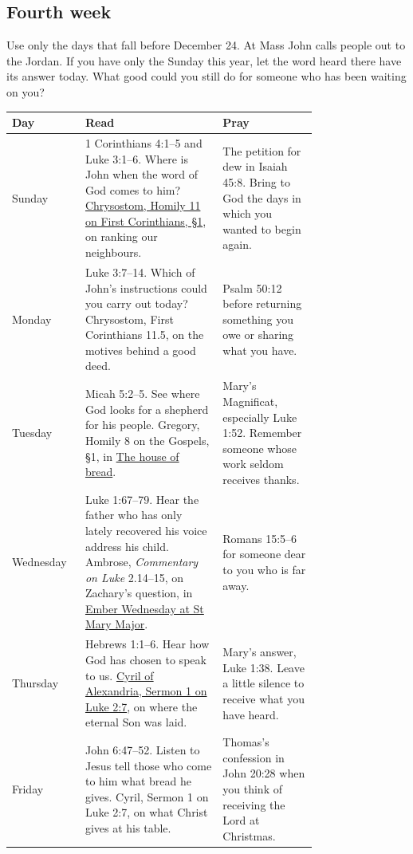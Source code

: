 \subsection{Fourth week}

Use only the days that fall before December 24. At Mass John calls
people out to the Jordan. If you have only the Sunday this year, let
the word heard there have its answer today. What good could you still
do for someone who has been waiting on you?

\begin{longtable}{@{}lp{0.45\linewidth}p{0.31\linewidth}@{}}
\textbf{Day} & \textbf{Read} & \textbf{Pray} \\
\hline
\endhead
Sunday & 1 Corinthians 4:1--5 and Luke 3:1--6. Where is John when the word of God comes to him? \href{https://www.newadvent.org/fathers/220111.htm}{Chrysostom, Homily 11 on First Corinthians, §1}, on ranking our neighbours. & The petition for dew in Isaiah 45:8. Bring to God the days in which you wanted to begin again. \\
Monday & Luke 3:7--14. Which of John's instructions could you carry out today? Chrysostom, First Corinthians 11.5, on the motives behind a good deed. & Psalm 50:12 before returning something you owe or sharing what you have. \\
Tuesday & Micah 5:2--5. See where God looks for a shepherd for his people. Gregory, Homily 8 on the Gospels, §1, in \hyperref[sec:advent-bethlehem]{The house of bread}. & Mary's Magnificat, especially Luke 1:52. Remember someone whose work seldom receives thanks. \\
Wednesday & Luke 1:67--79. Hear the father who has only lately recovered his voice address his child. Ambrose, \emph{Commentary on Luke} 2.14--15, on Zachary's question, in \hyperref[sec:advent-ember-wednesday]{Ember Wednesday at St Mary Major}. & Romans 15:5--6 for someone dear to you who is far away. \\
Thursday & Hebrews 1:1--6. Hear how God has chosen to speak to us. \href{https://www.tertullian.org/fathers/cyril_on_luke_01_sermons_01_11.htm}{Cyril of Alexandria, Sermon 1 on Luke 2:7}, on where the eternal Son was laid. & Mary's answer, Luke 1:38. Leave a little silence to receive what you have heard. \\
Friday & John 6:47--52. Listen to Jesus tell those who come to him what bread he gives. Cyril, Sermon 1 on Luke 2:7, on what Christ gives at his table. & Thomas's confession in John 20:28 when you think of receiving the Lord at Christmas. \\
\end{longtable}

